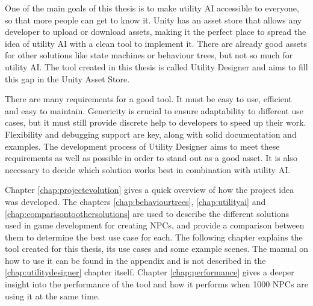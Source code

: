 One of the main goals of this thesis is to make utility AI accessible to everyone, so that more people can get to know it. Unity has an asset store that allows any developer to upload or download assets, making it the perfect place to spread the idea of utility AI with a clean tool to implement it. There are already good assets for other solutions like state machines or behaviour trees, but not so much for utility AI. The tool created in this thesis is called Utility Designer and aims to fill this gap in the Unity Asset Store.

There are many requirements for a good tool. It must be easy to use, efficient and easy to maintain. Genericity is crucial to ensure adaptability to different use cases, but it must still provide discrete help to developers to speed up their work. Flexibility and debugging support are key, along with solid documentation and examples. The development process of Utility Designer aims to meet these requirements as well as possible in order to stand out as a good asset. It is also necessary to decide which solution works best in combination with utility AI.

Chapter \ref{chap:projectevolution} gives a quick overview of how the project idea was developed. The chapters \ref{chap:behaviourtrees}, \ref{chap:utilityai} and \ref{chap:comparisontoothersolutions} are used to describe the different solutions used in game development for creating NPCs, and provide a comparison between them to determine the best use case for each. The following chapter explains the tool created for this thesis, its use cases and some example scenes. The manual on how to use it can be found in the appendix and is not described in the \ref{chap:utilitydesigner} chapter itself. Chapter \ref{chap:performance} gives a deeper insight into the performance of the tool and how it performs when 1000 NPCs are using it at the same time.